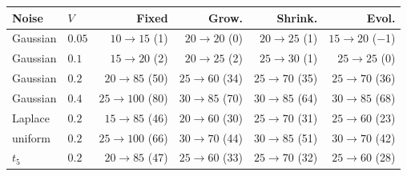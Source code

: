\begin{tabular}{llrrrr}
\toprule
Noise & $V$ & Fixed & Grow. & Shrink. & Evol.\\
\midrule
Gaussian & $0.05$ & $10{\to}15$ (1) & $20{\to}20$ (0) & $20{\to}25$ (1) & $15{\to}20$ ($-$1)\\
Gaussian & $0.1$ & $15{\to}20$ (2) & $20{\to}25$ (2) & $25{\to}30$ (1) & $25{\to}25$ (0)\\
Gaussian & $0.2$ & $20{\to}85$ (50) & $25{\to}60$ (34) & $25{\to}70$ (35) & $25{\to}70$ (36)\\
Gaussian & $0.4$ & $25{\to}100$ (80) & $30{\to}85$ (70) & $30{\to}85$ (64) & $30{\to}85$ (68)\\
Laplace & $0.2$ & $15{\to}85$ (46) & $20{\to}60$ (30) & $25{\to}70$ (31) & $25{\to}60$ (23)\\
uniform & $0.2$ & $25{\to}100$ (66) & $30{\to}70$ (44) & $30{\to}85$ (51) & $30{\to}70$ (42)\\
$t_5$ & $0.2$ & $20{\to}85$ (47) & $25{\to}60$ (33) & $25{\to}70$ (32) & $25{\to}60$ (28)\\
\bottomrule
\end{tabular}
